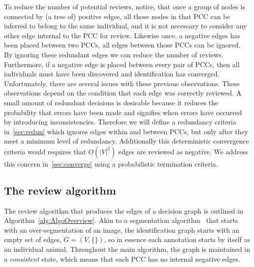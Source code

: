 To reduce the number of potential reviews, notice, that once a group of nodes is connected by (a tree of)
  positive edges, all those nodes in that PCC can be inferred to belong to the same individual, and it is not
  necessary to consider any other edge internal to the PCC for review.
Likewise once, a negative edges has been placed between two PCCs, all edges between those PCCs can be ignored.
By ignoring these redundant edges we can reduce the number of reviews.
Furthermore, if a negative edge is placed between every pair of PCCs, then all individuals must have been
  discovered and identification has converged.
Unfortunately, there are several issues with these previous observations.
These observations depend on the condition that each edge was correctly reviewed.
A small amount of redundant decisions is desirable because it reduces the probability that errors have been made
  and signifies when errors have occurred by introducing inconsistencies.
Therefore we will define a redundancy criteria in~\cref{sec:redun} which ignores edges within and between PCCs,
  but only after they meet a minimum level of redundancy.
Additionally this deterministic convergence criteria would requires that $O(|V|^2)$ edges are reviewed as
  negative.
We address this concern in~\cref{sec:converge} using a probabilistic termination criteria.

\subsection{The review algorithm}\label{sub:graphalgo}


The review algorithm that produces the edges of a decision graph is outlined in Algorithm~\ref{alg:AlgoOverview}.
Akin to a segmentation algorithm~\cite{fulkerson_class_2009} that starts with an over-segmentation of an image,
  the identification graph starts with an empty set of edges, $G = (V, \{ \})$, so in essence each annotation
  starts by itself as an individual animal.
Throughout the main algorithm, the graph is maintained in a \emph{consistent} state, which means that each PCC
  has no internal negative edges.

